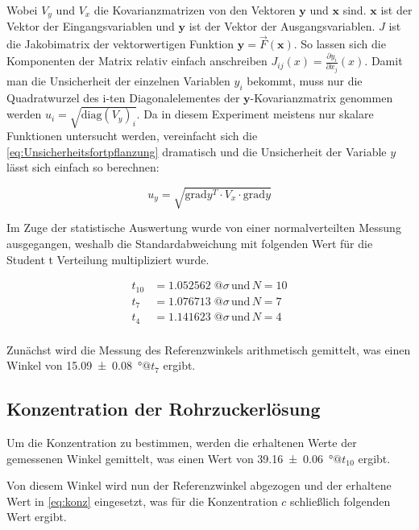 \documentclass[11pt,ngerman]{scrartcl}
\begin{document}
\noindent Wobei $V_y$ und $V_x$ die Kovarianzmatrizen von den Vektoren $\bm{y}$ und $\bm{x}$ sind.
$\bm{x}$ ist der Vektor der Eingangsvariablen und $\bm{y}$ ist der Vektor der Ausgangsvariablen.
$J$ ist die Jakobimatrix der vektorwertigen Funktion $\bm{y} = \vec{F}(\bm{x})$.
So lassen sich die Komponenten der Matrix relativ einfach anschreiben $J_{ij}(x) = \frac{\partial{y_i}}{\partial{x_j}}(x)$.
Damit man die Unsicherheit der einzelnen Variablen $y_i$ bekommt, muss nur die Quadratwurzel des i-ten Diagonalelementes der
$\bm{y}$-Kovarianzmatrix genommen werden $u_i= \sqrt{\mathrm{diag}(V_y)_i}$.
Da in diesem Experiment meistens nur skalare Funktionen untersucht werden, vereinfacht
sich die \autoref{eq:Unsicherheitsfortpflanzung} dramatisch und die Unsicherheit
der Variable $y$ lässt sich einfach so berechnen:

\begin{equation}
	\label{eq:graduncentainty}
	u_y = \sqrt{\mathrm{grad} y^T \cdot V_x \cdot \mathrm{grad} y}
\end{equation}

Im Zuge der statistische Auswertung wurde von einer normalverteilten Messung
ausgegangen, weshalb die Standardabweichung mit folgenden Wert für die Student
t Verteilung multipliziert wurde.

\begin{align*}
	t_10 & = 1.052562 \; @ \sigma \, \text{und} \, N=10 \\
	t_7  & = 1.076713 \; @ \sigma \, \text{und} \, N=7  \\
	t_4  & = 1.141623 \; @ \sigma \, \text{und} \, N=4  \\
\end{align*}

Zunächst wird die Messung des Referenzwinkels arithmetisch gemittelt, was einen
Winkel von \SI{15.09(8)}{\degree}$@t_7$ ergibt.

\subsection{Konzentration der Rohrzuckerlösung}

Um die Konzentration zu bestimmen, werden die erhaltenen Werte der gemessenen
Winkel gemittelt, was einen Wert von \SI{39.16(6)}{\degree}$@t_10$ ergibt.

Von diesem Winkel wird nun der Referenzwinkel abgezogen und der erhaltene Wert
in \autoref{eq:konz} eingesetzt, was für die Konzentration $c$ schließlich
folgenden Wert ergibt.
\end{document}
